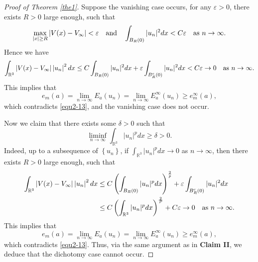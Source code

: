 \documentclass[reqno, 11pt]{amsart} %
\numberwithin{equation}{section}
\begin{document}
\begin{proof}[Proof of Theorem \ref{the1}]
		Suppose the vanishing case occurs, for any $\varepsilon>0$, there exists $R>0$ large enough, such that
		\begin{equation*}
			\max _{|x|\geq R}\left| V(x)-V_{\infty}\right| <\varepsilon\quad \hbox{and}\quad \int_{B_{R}(0)}|u_{n}|^{2}dx<C\varepsilon\quad  \hbox{as $n\rightarrow\infty$}.
		\end{equation*}
		Hence we have
		\begin{equation*}
			\int_{\mathbb{R}^{3}}\left|  V(x)-V_{\infty}\right|  \left| u_{n}\right| ^{2}dx\leq C\int_{B_{R}(0)}|u_{n}|^{2}dx+\varepsilon\int_{B^{c}_{R}(0)}|u_{n}|^{2}dx<C\varepsilon\rightarrow0\quad  \hbox{as $n\rightarrow\infty$}.
		\end{equation*}
		This implies that
		\begin{equation*}
			e_{m}(a)=\lim _{n\rightarrow\infty}E_{a}(u_{n})=\lim _{n\rightarrow\infty}E^{\infty}_{a}(u_{n})\geq e^{\infty}_{m}(a),
		\end{equation*}
		which contradicts \eqref{equ2-13}, and the vanishing case does not occur.
		
		Now we claim that there exists some $\delta>0$ such that
		\begin{equation*}
			\liminf_{n\rightarrow\infty}\int_{\mathbb{R}^{3}}|u_{n}|^{p}dx\geq \delta>0.
		\end{equation*}
		Indeed, up to a subsequence of $\left\lbrace u_{n}\right\rbrace $, if $\int_{\mathbb{R}^{3}}|u_{n}|^{p}dx\rightarrow0$ as $n\rightarrow\infty$, then there exists $R>0$ large enough, such that
		\begin{equation*}
			\begin{split}
				\int_{\mathbb{R}^{3}}\left|  V(x)-V_{\infty}\right|  \left| u_{n}\right| ^{2}dx
				&\leq C\left( \int_{B_{R}(0)}|u_{n}|^{p}dx\right) ^{\frac{2}{p}}+\varepsilon\int_{B^{c}_{R}(0)}|u_{n}|^{2}dx\\
				&\leq C\left( \int_{\mathbb{R}^{3}}|u_{n}|^{p}dx\right) ^{\frac{2}{P}}+C\varepsilon\rightarrow0\quad  \hbox{as $n\rightarrow\infty$}.
			\end{split}
		\end{equation*}
		This implies that
		\begin{equation*}
			e_{m}(a)=\lim _{n\rightarrow\infty}E_{a}(u_{n})=\lim _{n\rightarrow\infty}E^{\infty}_{a}(u_{n})\geq e^{\infty}_{m}(a),
		\end{equation*}
		which contradicts \eqref{equ2-13}. Thus, via the same argument as in {\bf  Claim II}, we deduce that the dichotomy case cannot occur.
		

\end{proof}
\end{document}
